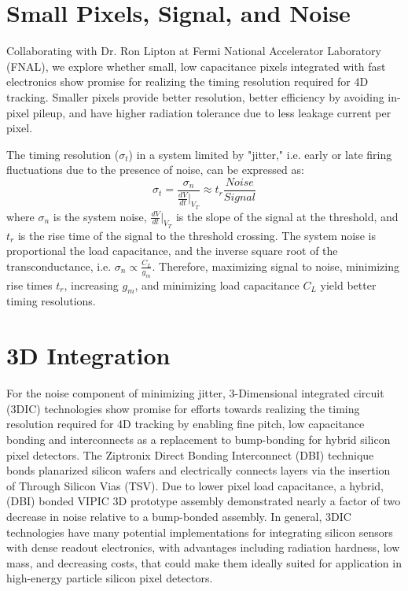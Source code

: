 \section{Small Pixels, Signal, and Noise}
Collaborating with Dr. Ron Lipton at Fermi National Accelerator Laboratory (FNAL), we explore whether small, low capacitance pixels integrated with fast electronics show promise for realizing the timing resolution required for 4D tracking.
Smaller pixels provide better resolution, better efficiency by avoiding in-pixel pileup, and have higher radiation tolerance due to less leakage current per pixel.

The timing resolution ($\sigma_t$) in a system limited by "jitter," i.e. early or late firing fluctuations due to the presence of noise, can be expressed as:
\begin{equation}
\sigma_t =\frac{\sigma_n}{\frac{d V}{d t}\vert_{V_T}} \approx t_r\frac{Noise}{Signal}
\end{equation}
where $\sigma_n$ is the system noise, $\frac{d V}{d t}\vert_{V_T}$ is the slope of the signal at the threshold, and $t_r$ is the rise time of the signal to the threshold crossing.
The system noise is proportional the load capacitance, and the inverse square root of the transconductance, i.e. $\sigma_n \propto \frac{C_L}{g_m}$.
Therefore, maximizing signal to noise, minimizing rise times $t_r$, increasing $g_m$, and minimizing load capacitance $C_L$ yield better timing resolutions.

\section{3D Integration}
For the noise component of minimizing jitter, 3-Dimensional integrated circuit (3DIC) technologies show promise for efforts towards realizing the timing resolution required for 4D tracking by enabling fine pitch, low capacitance bonding and interconnects as a replacement to bump-bonding for hybrid silicon pixel detectors. 
The Ziptronix Direct Bonding Interconnect (DBI) technique bonds planarized silicon wafers and electrically connects layers via the insertion of Through Silicon Vias (TSV). 
Due to lower pixel load capacitance, a hybrid, (DBI) bonded VIPIC 3D prototype assembly demonstrated nearly a factor of two decrease in noise relative to a bump-bonded assembly.
In general, 3DIC technologies have many potential implementations for integrating silicon sensors with dense readout electronics, with advantages including radiation hardness, low mass, and decreasing costs, that could make them ideally suited for application in high-energy particle silicon pixel detectors.

